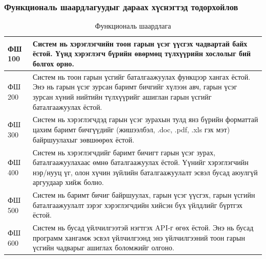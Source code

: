 \subsubsection{Функциональ шаардлагуудыг дараах хүснэгтэд тодорхойлов}
\begin{table}[h]
	\centering
	\caption{Функциональ шаардлага}
	\begin{tabular}{ |p{2cm}|p{13cm}| }
		\hline
		ФШ 100 & Систем нь хэрэглэгчийн тоон гарын үсэг үүсгэх чадвартай байх ёстой. Үүнд хэрэглэгч бүрийн өвөрмөц түлхүүрийн хослолыг бий болгох орно.                                                                             \\ \hline
		ФШ 200 & Систем нь тоон гарын үсгийг баталгаажуулах функцээр хангах ёстой. Энэ нь гарын үсэг зурсан баримт бичгийг хүлээн авч, гарын үсэг зурсан хүний нийтийн түлхүүрийг ашиглан гарын үсгийг баталгаажуулах ёстой.        \\ \hline
		ФШ 300 & Систем нь хэрэглэгчдэд гарын үсэг зурахын тулд янз бүрийн форматтай цахим баримт бичгүүдийг (жишээлбэл, .doc, .pdf, .xls гэх мэт) байршуулахыг зөвшөөрөх ёстой.                                                    \\ \hline
		ФШ 400 & Систем нь хэрэглэгчдийг баримт бичигт гарын үсэг зурах, баталгаажуулахаас өмнө баталгаажуулах ёстой. Үүнийг хэрэглэгчийн нэр/нууц үг, олон хүчин зүйлийн баталгаажуулалт эсвэл бусад аюулгүй аргуудаар хийж болно. \\ \hline
		ФШ 500 & Систем нь баримт бичиг байршуулах, гарын үсэг үүсгэх, гарын үсгийн баталгаажуулалт зэрэг хэрэглэгчдийн хийсэн бүх үйлдлийг бүртгэх ёстой.                                                                          \\ \hline
		ФШ 600 & Систем нь бусад үйлчилгээтэй нэгтгэх API-г өгөх ёстой. Энэ нь бусад программ хангамж эсвэл үйлчилгээнд энэ үйлчилгээний тоон гарын үсгийн чадварыг ашиглах боломжийг олгоно.                                        \\  \hline

	\end{tabular}
\end{table}
\pagebreak

